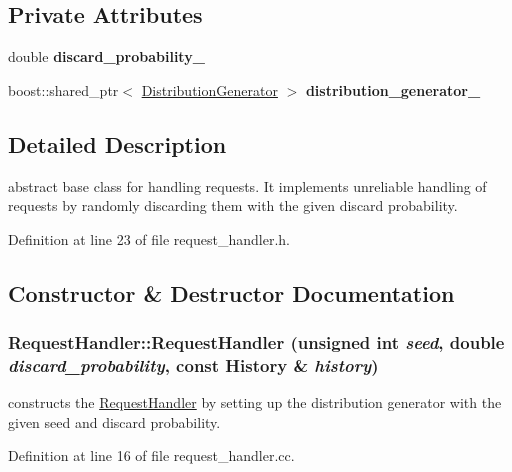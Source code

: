 \subsection*{Private Attributes}
\begin{CompactItemize}
\item 
\hypertarget{class_request_handler_adf54654024ab9b2aa41d50a69a2d8a8}{
double \textbf{discard\_\-probability\_\-}}
\label{class_request_handler_adf54654024ab9b2aa41d50a69a2d8a8}

\item 
\hypertarget{class_request_handler_045da9cac28878d81e8813d747a536d1}{
boost::shared\_\-ptr$<$ \hyperlink{class_distribution_generator}{DistributionGenerator} $>$ \textbf{distribution\_\-generator\_\-}}
\label{class_request_handler_045da9cac28878d81e8813d747a536d1}

\end{CompactItemize}


\subsection{Detailed Description}
abstract base class for handling requests. It implements unreliable handling of requests by randomly discarding them with the given discard probability. 

Definition at line 23 of file request\_\-handler.h.

\subsection{Constructor \& Destructor Documentation}
\hypertarget{class_request_handler_eb1589536489e52f0d6b0207f5d861d2}{
\subsubsection[RequestHandler]{\setlength{\rightskip}{0pt plus 5cm}RequestHandler::RequestHandler (unsigned int {\em seed}, \/  double {\em discard\_\-probability}, \/  const {\bf History} \& {\em history})}}
\label{class_request_handler_eb1589536489e52f0d6b0207f5d861d2}


constructs the \hyperlink{class_request_handler}{RequestHandler} by setting up the distribution generator with the given seed and discard probability. 

Definition at line 16 of file request\_\-handler.cc.


